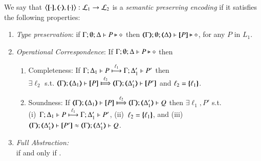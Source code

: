 \begin{definition}\rm
	\label{def:ep}
	We say that $\enco{\map{\cdot}, \mapt{\cdot}, \mapa{\cdot}}: \tyl{L}_1 \to \tyl{L}_2$ is a \emph{semantic preserving encoding}
	if it satisfies the following properties:
	
	\begin{enumerate}[1.]
		\item \emph{Type preservation}:
		if
			$\Gamma; \emptyset; \Delta \proves P \hastype \Proc$ then 
			$\mapt{\Gamma}; \emptyset; \mapt{\Delta} \proves \map{P} \hastype \Proc$,  
			for any   $P$ in $L_1$.

		\item \emph{Operational Correspondence}: If $\Gamma; \emptyset; \Delta \proves P \hastype \Proc$ then
		\begin{enumerate}[-]
			\item	Completeness: 
			   If  $\stytra{\Gamma}{\ell_1}{\Delta_1}{P}{\Delta'_1}{P'}$
			   then \\ $\exists \ell_2$ s.t. 
			    $\wtytra{\mapt{\Gamma}}{\ell_2}{\mapt{\Delta_1}}{\map{P}}{\mapt{\Delta'_1}}{\map{P'}}$
			    and $\ell_2 = \mapa{\ell_1}$.
			    				
				
			\item Soundness:   
			If  $\wtytra{\mapt{\Gamma}}{\ell_2}{\mapt{\Delta_1}}{\map{P}}{\mapt{\Delta'_1}}{Q}$
			   then $\exists \ell_1, P'$ s.t.  \\
			    (i)~$\stytra{\Gamma}{\ell_1}{\Delta_1}{P}{\Delta'_1}{P'}$,
			    (ii)~$\ell_2 = \mapa{\ell_1}$, and
			    (iii)~$\wbb{\mapt{\Gamma}}{\ell}{\mapt{\Delta'_1}}{\map{P'}}{\mapt{\Delta'_1}}{Q}$.
		\end{enumerate}
		
		\item \emph{Full Abstraction:} \\
		if and only if
		.
	\end{enumerate}
\end{definition}

